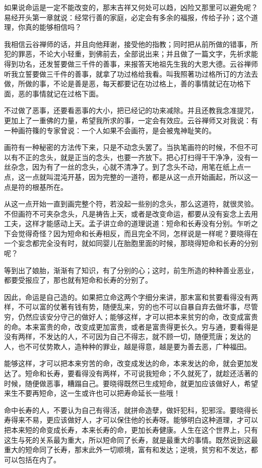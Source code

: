\documentclass[12pt,twoside,openany]{book}
\begin{document}
如果说命运是一定不能改变的，那末吉祥又何处可以趋，凶险又那里可以避免呢？易经开头第一章就说：经常行善的家庭，必定会有多余的福报，传给子孙；这个道理，你真的能够相信吗？

我相信云谷禅师的话，并且向他拜谢，接受他的指教；同时把从前所做的错事，所犯的罪恶，不论大小轻重，到佛前去，全部说出来；并且做了一篇文字，先祈求能得到功名，还发誓要做三千件的善事，来报答天地祖先生我的大恩大德。云谷禅师听我立誓要做三千件的善事，就拿了功过格给我看。叫我照著功过格所订的方法去做，所做的事，不论是善是恶，每天都要记在功过格上，善的事情就记在功格下面，恶的事情就记在过格下面。

不过做了恶事，还要看恶事的大小，把已经记的功来减除。并且还教我念准提咒，更加上了一重佛的力量，希望我所求的事，一定会有效应。云谷禅师又对我说：有一种画符篠的专家曾说：一个人如果不会画符，是会被鬼神耻笑的。

画符有一种秘密的方法传下来，只是不动念头罢了。当执笔画符的时候，不但不可以有不正的念头，就是正当的念头，也要一齐放下。把心打扫得干干净净，没有一丝杂念，因为有了一丝的念头，心就不清净了。到了念头不动，用笔在纸上点一点，这一点就叫混沌开基，因为完整的一道符，都是从这一点开始画起，所以这一点是符的根基所在。

从这一点开始一直到画完整个符，若没起一些别的念头，那么这道符，就很灵验。不但画符不可夹杂念头，凡是祷告上天，或者是改变命运，都要从没有妄念上去用工夫，这样才能感动上天。孟子讲立命的道理说道：短命和长寿没有分别。乍听之下会觉得奇怪？因为短命和长寿相反，而且完全不同，怎样说是一样呢？要晓得在一个妄念都完全没有时，就如同婴儿在胎胞里面的时候，那晓得短命和长寿的分别呢？

等到出了娘胎，渐渐有了知识，有了分别的心；这时，前生所造的种种善业恶业，都要受报应了，那也就有短命和长寿的分别了。

因此，命运是自己造的。如果把立命这两个字细分来讲，那末富和贫要看得没有两样，不可以富的仗著有钱有势，随便乱来，穷的也不可以自暴自弃去做坏事，尽管穷，仍然应该安分守己的做好人；能够这样，才可以把本来贫穷的命，改变成富贵的命。本来富贵的命，改变成更加富贵，或者是富贵得更长久。穷与通，要看得是没有两样，不发达的人，不可因为自己不得志，就不顾一切，随便荒唐；发达的人，也不可仗势欺人，造种种的罪业，越是得意，越是要为善去恶，广种福田。

能够这样，才可以把本来穷苦的命，改变成发达的命，本来发达的命，就会更加发达了。短命和长寿，要看得没有两样，不可说我短命；不久就死了，就趁还活著的时候，随便做恶事，糟蹋自己。要晓得既然已生成短命，就更加应该做好人，希望来生不要再短命，这一生或许也可以把寿命延长一些哦！

命中长寿的人，不要认为自己有得活，就拼命造孽，做奸犯科，犯邪淫。要晓得长寿得来不易，更应该做好人，才可以保住他的长寿呀。能够明白这种道理，才可以把本来短的命变成长寿，本来长寿的命，更加长寿健康。人生在这个世界上，只有这生与死的关系最为重大，所以短命同了长寿，就是最重大的事情。既然说到这最重大的短命同了长寿，那末此外一切顺境，富有和发达；逆境，贫穷和不发达，都可以包括在内了。
\end{document}
